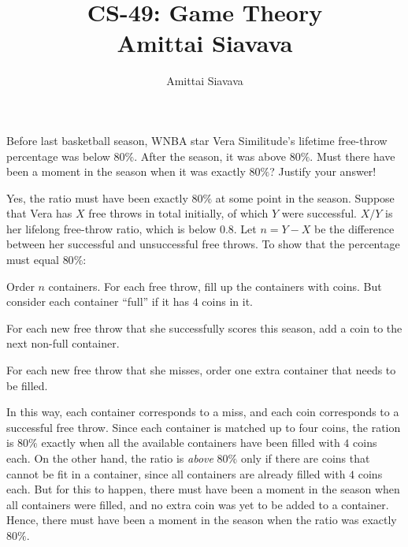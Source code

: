 \documentclass[11pt, reqno]{amsart}
\begin{document}

\title{CS-49: Game Theory\\ Amittai Siavava \\ }
\author{Amittai Siavava}


\setlength{\headheight}{13.0pt}
\setlength{\footskip}{15.0pt}

\maketitle

\bigskip

\def \cram { \textsc{cram} }
\def \dom { \textsc{domineering} }
\def \sub { \textsc{subtraction} }
\def \weighted { \textsc{weighted odds and evens}}

\begin{problem}[8]
  Before last basketball season, WNBA star Vera Similitude's lifetime free-throw
  percentage was below $80\%$. After the season, it was above $80\%$.
  Must there have been a moment in the season when it was exactly $80\%$?
  Justify your answer!

  \medskip
  Yes, the ratio must have been exactly $80\%$ at some point in the season.
  Suppose that Vera has $X$ free throws in total initially, of which $Y$ were successful.
  $X/Y$ is her lifelong free-throw ratio, which is below $0.8$.
  Let $n = Y - X$ be the difference between her successful and unsuccessful free throws.
  To show that the percentage must equal $80\%$:
  \begin{enumarabic}
    \item Order $n$ containers. For each free throw, fill up the containers with coins.
      But consider each container ``full'' if it has $4$ coins in it.
    \item For each new free throw that she successfully scores this season,
      add a coin to the next non-full container.
    \item For each new free throw that she misses, order one extra container
      that needs to be filled.
  \end{enumarabic}
  \medskip
  In this way, each container corresponds to a miss, and each coin corresponds to
  a successful free throw. Since each container is matched up to four coins,
  the ration is $80\%$ exactly when all the available containers have been filled
  with $4$ coins each.
  On the other hand, the ratio is \emph{above} $80\%$ only if there are coins
  that cannot be fit in a container, since all containers are already filled with
  $4$ coins each.
  But for this to happen, there must have been a moment in the season when
  all containers were filled, and no extra coin was yet to be added to a container.
  Hence, there must have been a moment in the season when the ratio was exactly $80\%$.

  \medskip

\end{problem}
\end{document}
